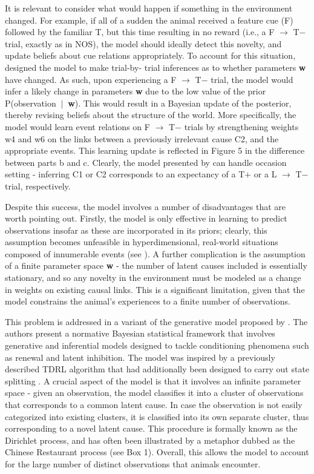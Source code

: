 \documentclass[11pt]{article}
\newcommand\given[1][]{\:#1\vert\:} %
\let\cite=\citep
\let\citeN=\citet
\let\citeNP=\citealt
\begin{document}
It is relevant to consider what would happen if something in the environment 
changed. For example, if all of a sudden the animal received a feature cue (F) 
followed by the familiar T, but this time resulting in no reward (i.e., a F $
\rightarrow$ T$-$ trial, exactly as in NOS), the model should ideally detect 
this novelty, and update beliefs about cue relations appropriately. To account 
for this situation, \citeN{Courville2006} designed the model to make trial-by-
trial inferences as to whether parameters \textbf{w} have changed. As such, 
upon experiencing a F $\rightarrow$ T$-$ trial, the model would infer a likely 
change in parameters \textbf{w} due to the low value of the prior P(observation 
$\given$ \textbf{w}). This would result in a Bayesian update of the posterior, 
thereby revising beliefs about the structure of the world. More specifically, 
the model would learn event relations on F $\rightarrow$ T$-$ trials by 
strengthening weights w4 and w6 on the links between a previously irrelevant 
cause C2, and the appropriate events. This learning update is reflected in 
Figure 5 in the difference between parts b and c. Clearly, the model presented 
by \citeN{Courville2006} can handle occasion setting - inferring C1 or C2 
corresponds to an expectancy of a T$+$ or a L $\rightarrow$ T$-$ trial, 
respectively.

Despite this success, the model involves a number of disadvantages that are 
worth pointing out. Firstly, the model is only effective in learning to predict 
observations insofar as these are incorporated in its priors; clearly, this 
assumption becomes unfeasible in hyperdimensional, real-world situations 
composed of innumerable events (see \citeNP{Gershman2010a}). A further 
complication is the assumption of a finite parameter space \textbf{w} - the 
number of latent causes included is essentially stationary, and so any novelty 
in the environment must be modeled as a change in weights on existing causal 
links. This is a significant limitation, given that the model constrains the 
animal's experiences to a finite number of observations.

This problem is addressed in a variant of the generative model proposed by 
\citeN{Gershman2010}. The authors present a normative Bayesian statistical 
framework that involves generative and inferential models designed to tackle 
conditioning phenomena such as renewal and latent inhibition. The model was 
inspired by a previously described TDRL algorithm that had additionally been 
designed to carry out state splitting \cite{Redish2007}. A crucial aspect of 
the \citeN{Gershman2010} model is that it involves an infinite parameter space 
- given an observation, the model classifies it into a cluster of observations 
that corresponds to a common latent cause. In case the observation is not 
easily categorized into existing clusters, it is classified into its own 
separate cluster, thus corresponding to a novel latent cause. This procedure is 
formally known as the Dirichlet process, and has often been illustrated by a 
metaphor dubbed as the Chinese Restaurant process (see Box 1). Overall, this 
allows the model to account for the large number of distinct observations that 
animals encounter.

{}
\end{document}
